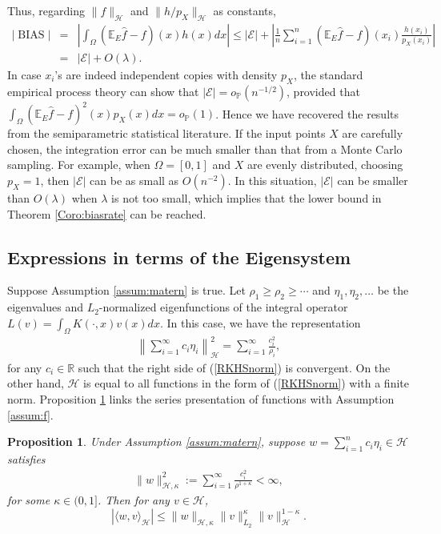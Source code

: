 \documentclass[12pt]{article}
\theoremstyle{plain}
\newtheorem{proposition}{Proposition}
\theoremstyle{remark}
\begin{document}
Thus, regarding $\|f\|_\mathcal{H}$ and $\|h/p_X\|_{\mathcal{H}}$ as constants,
\begin{eqnarray*}
    |\operatorname{BIAS}|&=&\left|\int_\Omega (\mathbb{E}_E\hat{f}-f)(x)h(x)dx\right|\leq|\mathscr{E}|+\left|\frac{1}{n}\sum_{i=1}^n (\mathbb{E}_E\hat{f}-f)(x_i)\frac{h(x_i)}{p_X(x_i)}\right|\\
    &=&|\mathscr{E}|+O(\lambda).
\end{eqnarray*}
In case $x_i$'s are indeed independent copies with density $p_X$, the standard empirical process theory \citep{geer2000empirical} can show that $|\mathscr{E}|=o_\mathbb{P}(n^{-1/2})$, provided that $\int_\Omega(\mathbb{E}_E\hat{f}-f)^2(x)p_X(x)dx=o_\mathbb{P}(1)$. Hence we have recovered the results from the semiparametric statistical literature. 
If the input points $X$ are carefully chosen, the integration error can be much smaller than that from a Monte Carlo sampling. For example, when $\Omega=[0,1]$ and $X$ are evenly distributed, choosing $p_X=1$, then $|\mathscr{E}|$ can be as small as $O(n^{-2})$. In this situation, $|\mathscr{E}|$ can be smaller than $O(\lambda)$ when $\lambda$ is not too small, which implies that the lower bound in Theorem \ref{Coro:biasrate} can be reached.

\subsection{Expressions in terms of the Eigensystem}\label{sec: eigen_series}
Suppose Assumption \ref{assum:matern} is true. Let $\rho_1\geq \rho_2\geq \cdots$ and $\eta_1,\eta_2,\ldots$ be the eigenvalues and $L_2$-normalized eigenfunctions of the integral operator $L(v)=\int_\Omega K(\cdot,x)v(x)dx$. In this case, we have the representation
\begin{eqnarray}\label{RKHSnorm}
    \left\|\sum_{i=1}^\infty c_i \eta_i\right\|^2_\mathcal{H}=\sum_{i=1}^\infty\frac{c_i^2}{\rho_i},
\end{eqnarray}
for any $c_i\in\mathbb{R}$ such that the right side of (\ref{RKHSnorm}) is convergent. On the other hand, $\mathcal{H}$ is equal to all functions in the form of (\ref{RKHSnorm}) with a finite norm. Proposition \ref{Prop:series} links the series presentation of functions with Assumption \ref{assum:f}.

\begin{proposition}\label{Prop:series}
    Under Assumption \ref{assum:matern},
    suppose $w=\sum_{i=1}^n c_i \eta_i\in\mathcal{H}$ satisfies
    \begin{eqnarray}\label{Hkappanorm}
        \|w\|_{\mathcal{H},\kappa}^2:=\sum_{i=1}^\infty \frac{c_i^2}{\rho^{1+\kappa}}<\infty,
    \end{eqnarray}
    for some $\kappa\in(0,1]$. Then for any $v\in\mathcal{H}$,
    \[|\langle w,v\rangle_\mathcal{H}|\leq \|w\|_{\mathcal{H},\kappa}\|v\|^{\kappa}_{L_2}\|v\|^{1-\kappa}_{\mathcal{H}}.\]
\end{proposition}
\end{document}
